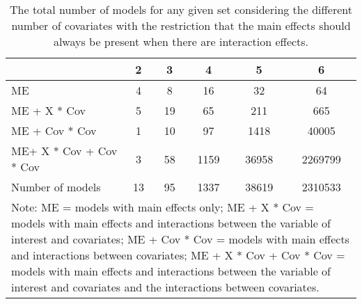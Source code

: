 \begin{table}[!h]
\centering
\caption{The total number of models for any given set considering the different number of covariates with the restriction that the main effects should always be present when there are interaction effects.} 
\begin{tabular}{lccccc}
  \hline
 & 2 & 3 & 4 & 5 & 6 \\ 
  \hline
ME & 4 & 8 & 16 & 32 & 64 \\ 
  ME + X * Cov & 5 & 19 & 65 & 211 & 665 \\ 
  ME + Cov * Cov & 1 & 10 & 97 & 1418 & 40005 \\ 
  ME+ X * Cov + Cov * Cov & 3 & 58 & 1159 & 36958 & 2269799 \\ 
  Number of models & 13 & 95 & 1337 & 38619 & 2310533 \\ 
   \hline 
\multicolumn{6}{p{16cm}}{\footnotesize{Note: ME = models with main effects only; ME + X * Cov = models with main effects and interactions between the variable of interest and covariates; ME + Cov * Cov = models with main effects and interactions between covariates; ME + X * Cov + Cov * Cov = models with main effects and interactions between the variable of interest and covariates and the interactions between covariates.}} 
 \hline
\end{tabular}
\end{table}
